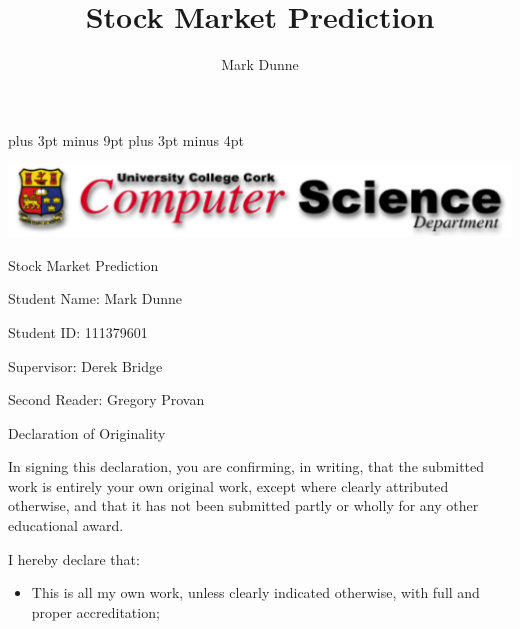 \documentclass{report}
\title{Stock Market Prediction}
\author{Mark Dunne}
\begin{document}
\lstset{language=Python}    
\belowdisplayskip=12pt plus 3pt minus 9pt
\belowdisplayshortskip=7pt plus 3pt minus 4pt


\begin{titlepage}
\begin{center}

\includegraphics[width=\textwidth]{vis/title.png}

\vspace{50pt}

{ \huge Stock Market Prediction }



\vspace{50pt}

  { \large
  Student Name: Mark Dunne

  \vspace{20pt}

  Student ID: 111379601

  \vspace{20pt}

  Supervisor: Derek Bridge

  \vspace{20pt}

  Second Reader: Gregory Provan  
}

\end{center}

\clearpage

\begin{center}
	{ \huge Declaration of Originality }
\end{center}

\vspace{50pt}

In signing this declaration, you are confirming, in writing, that the submitted work is entirely your own original work, except where clearly attributed otherwise, and that it has not been submitted partly or wholly for any other educational award.

\vspace{10pt}

I hereby declare that:

\begin{itemize}
  \item This is all my own work, unless clearly indicated otherwise, with full and proper accreditation; 


\end{itemize}
\end{titlepage}
\end{document}

